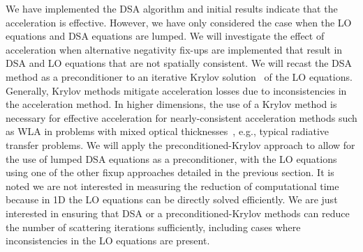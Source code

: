 \documentclass[11pt]{article}
\newcommand{\B}[1]{\ensuremath{\mathbf{#1}}}
\begin{document}
We have implemented the DSA algorithm and initial results indicate that the
acceleration is effective.  However, we have only considered the case when
the LO equations and DSA equations are lumped.  We will investigate the effect of acceleration when alternative negativity fix-ups are
implemented that result in DSA and LO equations that are not spatially consistent.
We will recast the DSA method as a preconditioner to an iterative
Krylov solution~\cite{larson_morel_sn} of the LO equations.  Generally, Krylov
methods mitigate acceleration losses due to inconsistencies in the acceleration
method.  In higher dimensions, the use of a Krylov method is necessary for effective
acceleration for nearly-consistent acceleration methods such as WLA in problems with
mixed optical thicknesses~\cite{larson_morel_sn}, e.g., typical radiative transfer
problems.
  We will apply the preconditioned-Krylov approach to allow for the use of lumped DSA
  equations as a preconditioner, with the LO equations using one of the other fixup
approaches detailed
in the previous section.  It is noted we are not interested in measuring the reduction of
computational time because in 1D the LO equations can be directly solved efficiently.
We are just interested in ensuring that DSA or a preconditioned-Krylov methods can reduce the
number of scattering iterations sufficiently, including cases where inconsistencies
in the LO equations are present.  %
%
%
\end{document}
